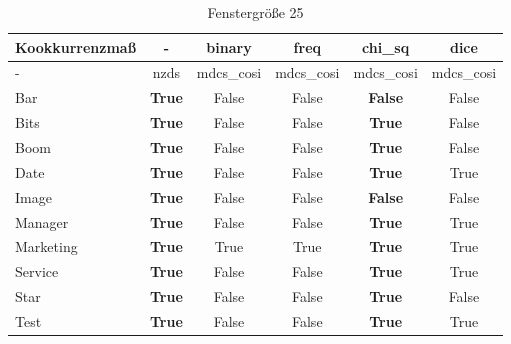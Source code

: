 \documentclass[11pt,numbers=noenddot]{scrartcl}
\begin{document}
\begin{table}[h]
    \begin{center}
        \begin{tabular}{ l | *{5}{c}  }
            Kookkurrenzmaß & - & binary & freq & chi\_sq & dice \\ \hline
               -      & nzds   &  mdcs\_cosi & mdcs\_cosi & mdcs\_cosi & mdcs\_cosi  \\ \hline
            Bar      &  \textbf{True}   &  False     &   False   &  \textbf{False}  & False    \\
            Bits     &  \textbf{True}   &  False     &   False   &  \textbf{True}   & False    \\
            Boom     &  \textbf{True}   &  False     &   False   &  \textbf{True}   & False    \\
            Date     &  \textbf{True}   &  False     &   False   &  \textbf{True}   & True   \\
            Image    &  \textbf{True}   &  False     &   False   &  \textbf{False}  & False   \\
            Manager  &  \textbf{True}   &  False     &   False   &  \textbf{True}   & True  \\
            Marketing&  \textbf{True}   &  True      &   True    &  \textbf{True}   & True   \\
            Service  &  \textbf{True}   &  False     &   False   &  \textbf{True}   & True   \\
            Star     &  \textbf{True}   &  False     &   False   &  \textbf{True}   & False  \\
            Test     &  \textbf{True}   &  False     &   False   &  \textbf{True}  & True
        \end{tabular}
    \end{center}
    \caption{Fenstergröße 25}
\end{table}
\end{document}
